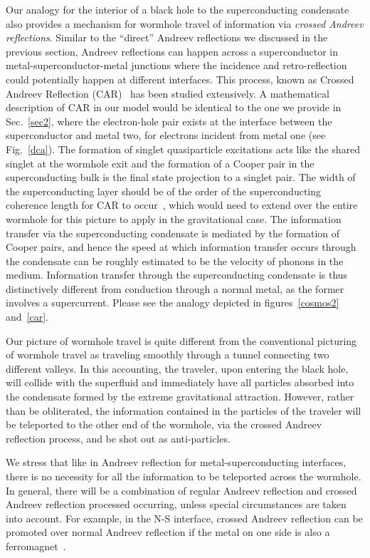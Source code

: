 \documentclass[12pt,letterpaper,aps,onecolumn,superscriptaddress,floatfix,notitlepage]{revtex4-1}
\begin{document}
	Our analogy for the interior of a black hole to the superconducting condensate also provides a mechanism for wormhole travel of information via \textit{crossed Andreev reflections}.  Similar to the ``direct'' Andreev reflections we discussed in the previous section, Andreev reflections can happen across a superconductor in metal-superconductor-metal junctions where the incidence and retro-reflection could potentially happen at different interfaces. This process, known as Crossed Andreev Reflection (CAR)~\cite{car} has been studied extensively. A mathematical description of CAR in our model would be identical to the one we provide in Sec.~\ref{sec2}, where the electron-hole pair exists at the interface between the superconductor and metal two, for electrons incident from metal one (see Fig.~\ref{dca}). The formation of singlet quasiparticle excitations acts like the shared singlet at the wormhole exit and the formation of a Cooper pair in the superconducting bulk is the final state projection to a singlet pair. The width of the superconducting layer should be of the order of the superconducting coherence length for CAR to occur~\cite{car}, which would need to extend over the entire wormhole for this picture to apply in the gravitational case. The information transfer via the superconducting condensate is mediated by the formation of Cooper pairs, and hence the speed at which information transfer occurs through the condensate can be roughly estimated to be the velocity of phonons in the medium. Information transfer through the superconducting condensate is thus distinctively different from conduction through a normal metal, as the former involves a supercurrent. Please see the analogy depicted in figures~\ref{cosmos2} and~\ref{car}.
	
	Our picture of wormhole travel is quite different from the conventional picturing of wormhole travel as traveling smoothly through a tunnel connecting two different valleys.  In this accounting, the traveler, upon entering the black hole, will collide with the superfluid and immediately have all particles absorbed into the condensate formed by the extreme gravitational attraction.  However, rather than be obliterated, the information contained in the particles of the traveler will be teleported to the other end of the wormhole, via the crossed Andreev reflection process, and be shot out as anti-particles.    
	
	We stress that like in Andreev reflection for metal-superconducting interfaces, there is no necessity for all the information to be teleported across the wormhole.  In general, there will be a combination of regular Andreev reflection and crossed Andreev reflection processed occurring, unless special circumstances are taken into account.  For example, in the N-S interface, crossed Andreev reflection can be promoted over normal Andreev reflection if the metal on one side is also a ferromagnet~\cite{cadden2007charge}.
	
\end{document}
